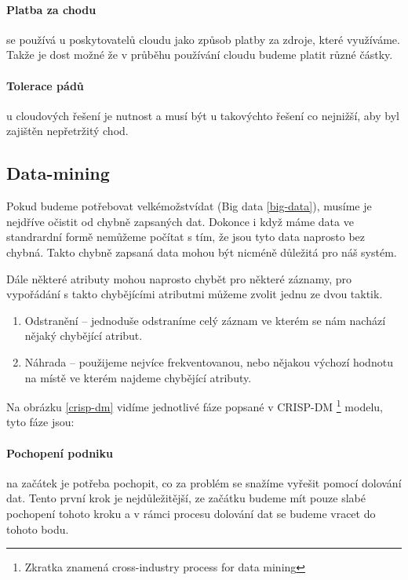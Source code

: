 \paragraph{Platba za chodu} se používá u poskytovatelů cloudu jako způsob platby za zdroje, které využíváme. Takže je dost možné že v průběhu používání cloudu budeme platit různé částky. \cite{big-data-dummies}

\paragraph{Tolerace pádů} u cloudových řešení je nutnost a musí být u takovýchto řešení co nejnižší, aby byl zajištěn nepřetržitý chod. \cite{big-data-dummies}

\subsection{Data-mining}
\par Pokud budeme potřebovat velkémožstvídat (Big data \ref{big-data}), musíme je nejdříve očistit od chybně zapsaných dat. Dokonce i když máme data ve standrardní formě nemůžeme počítat s tím, že jsou tyto data naprosto bez chybná. Takto chybně zapsaná data mohou být nicméně důležitá pro náš systém.\cite{data-mining-principles}

\par Dále některé atributy mohou naprosto chybět pro některé záznamy, pro vypořádání s takto chybějícími atributmi můžeme zvolit jednu ze dvou taktik. \cite{data-mining-principles}
\begin{enumerate}
  \item Odstranění -- jednoduše odstraníme celý záznam ve kterém se nám nachází nějaký chybějící atribut.
  \item Náhrada -- použijeme nejvíce frekventovanou, nebo nějakou výchozí hodnotu na místě ve kterém najdeme chybějící atributy. \cite{data-mining-principles}
\end{enumerate}

\par Na obrázku \ref{crisp-dm} vidíme jednotlivé fáze popsané v CRISP-DM \footnote{Zkratka znamená cross-industry process for data mining} modelu, tyto fáze jsou:
\paragraph{Pochopení podniku} na začátek je potřeba pochopit, co za problém se snažíme vyřešit pomocí dolování dat. Tento první krok je nejdůležitější, ze začátku budeme mít pouze slabé pochopení tohoto kroku a v rámci procesu dolování dat se budeme vracet do tohoto bodu. \cite{data-mining-practical}

